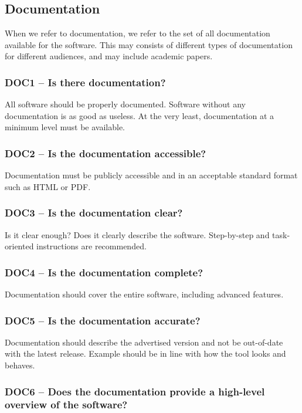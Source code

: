 \documentclass[a4paper,11pt]{article}
\begin{document}
\subsection{Documentation}

When we refer to documentation, we refer to the set of all documentation
available for the software. This may consists of different types of
documentation for different audiences, and may include academic papers.

\subsubsection{DOC1 -- Is there documentation?}

All software should be properly documented. Software without any documentation
is as good as useless. At the very least, documentation at a minimum level
must be available. 

\subsubsection{DOC2 -- Is the documentation accessible?}

Documentation must be publicly accessible and in an acceptable standard format
such as HTML or PDF.

\subsubsection{DOC3 -- Is the documentation clear?}

Is it clear enough? Does it clearly describe the software. Step-by-step
and task-oriented instructions are recommended.

\subsubsection{DOC4 -- Is the documentation complete?}

Documentation should cover the entire software, including advanced features.

\subsubsection{DOC5 -- Is the documentation accurate?}

Documentation should describe the advertised version and not be out-of-date
with the latest release. Example should be in line with how the tool looks and
behaves.

\subsubsection{DOC6 -- Does the documentation provide a high-level overview of the software?}
\end{document}
